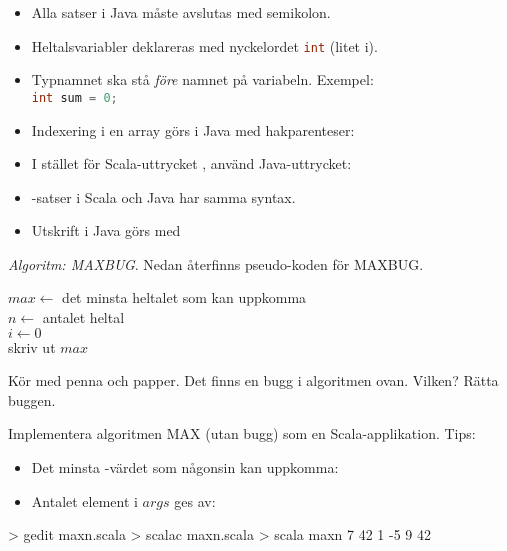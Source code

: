 \begin{itemize}[noitemsep, nolistsep]
\item Alla satser i Java måste avslutas med semikolon.
\item Heltalsvariabler deklareras med nyckelordet \lstinline[language=Java]{int} (litet i). 
\item Typnamnet ska stå \emph{före} namnet på variabeln. Exempel: \\ \lstinline[language=Java]{int sum = 0;}
\item Indexering i en array görs i Java med hakparenteser: 
\item I stället för Scala-uttrycket , använd Java-uttrycket: \\ 
\item {}-satser i Scala och Java har samma syntax.
\item Utskrift i Java görs med 
\end{itemize}


\Task \emph{Algoritm: MAXBUG}. Nedan återfinns pseudo-koden för MAXBUG. 

\begin{algorithm}[H]
 
 $max \leftarrow$ det minsta heltalet som kan uppkomma  \\
 $n \leftarrow $ antalet heltal \\
 $i \leftarrow 0$ \\
 skriv ut $max$
\end{algorithm}

\Subtask\Pen Kör med penna och papper. Det finns en bugg i algoritmen ovan. Vilken? Rätta buggen.

\Subtask Implementera algoritmen MAX (utan bugg) som en Scala-applikation. Tips:
\begin{itemize}[noitemsep, nolistsep]
\item Det minsta -värdet som någonsin kan uppkomma: 
\item Antalet element i $args$ ges av: 
\end{itemize}

\begin{REPL}
> gedit maxn.scala
> scalac maxn.scala
> scala maxn 7 42 1 -5 9
42
\end{REPL}

